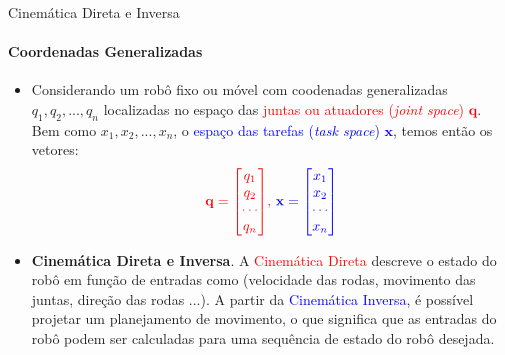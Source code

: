 \documentclass{beamer}
\begin{document}


\begin{frame}{Cinemática Direta e Inversa}
    \framesubtitle{Coordenadas Generalizadas}
    \begin{itemize}
        \item Considerando um robô fixo ou móvel com coodenadas generalizadas $q_1, q_2,..., q_n$ localizadas no espaço das \textcolor{red}{juntas ou atuadores (\textit{joint space}) $\mathbf{q}$}. Bem como $x_1, x_2,..., x_n$, o \textcolor{blue}{espaço das tarefas (\textit{task space}) $\mathbf{x}$}, temos então os vetores:
             \begin{equation*}
                \color{red}{
                  \mathbf{q} =
                  \begin{bmatrix}
                      q_1 \\q_2 \\ \cdots  \\ q_n
                  \end{bmatrix}
                }
                  \text{, }
                \color{blue}{
                  \mathbf{x} =
                  \begin{bmatrix}
                      x_1 \\x_2 \\ \cdots \\ x_n
                  \end{bmatrix}
                }
              \end{equation*}

        \item \textbf{Cinemática Direta e Inversa}. A \textcolor{red}{Cinemática Direta} descreve o estado do robô em função de entradas como (velocidade das rodas, movimento das juntas, direção das rodas ...).  A partir da \textcolor{blue}{Cinemática Inversa}, é possível projetar um planejamento de movimento, o que significa que as entradas do robô podem ser calculadas para uma sequência de estado do robô desejada.

    \end{itemize}
\end{frame}
\end{document}

